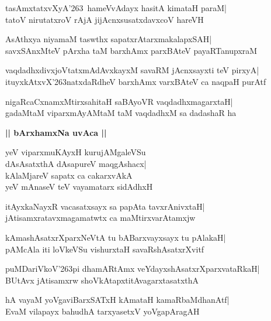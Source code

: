 \documentclass[twoside,12pt,openright]{book}
\def\S{\char'263}
\newcounter{shloka}[chapter]
\def\uvaca#1{\centerline{{\large\textbf{#1}}}}
\begin{document}
\begin{shloka}%
tasAmxtatxvXyA\S \ hameVvAdayx hasitA kimataH paraM|\\
tatoV nirutatxroV rAjA jijAcnxsusatxdavxcoV hareVH
\end{shloka}

\begin{shloka}%
AsAthxya niyamaM taswthx sapatxrAtarxmakalapxSAH|\\
savxSAnxMteV pArxha taM barxhAmx parxBAteV payaRTanupxraM
\end{shloka}

\begin{shloka}%
vaqdadhxdivxjoVtatxmAdAvxkayxM savaRM jAcnxsayxti teV pirxyA|\\
ituyxkAtxvX\S natxdaRdheV barxhAmx varxBAteV ca naqpaH purAtf
\end{shloka}

\begin{shloka}%
nigaRcaCxnamxMtirxsahitaH saBAyoVR vaqdadhxmagarxtaH|\\
gadaMtaM viparxmAyAMtaM taM vaqdadhxM sa dadashaR ha
\end{shloka}

\uvaca{|| bArxhamxNa uvAca ||}
\begin{shloka}%
yeV viparxmuKAyxH kurujAMgaleVSu\\
dAsAsatxthA dAsapureV maqgAshacx|\\
kAlaMjareV sapatx ca cakarxvAkA\\
yeV mAnaseV teV vayamatarx sidAdhxH
\end{shloka}

\begin{shloka}%
itAyxkaNayxR vacasatxsayx sa papAta tavxrAnivxtaH|\\
jAtisamxratavxmagamatwtx ca maMtirxvarAtamxjw
\end{shloka}

\begin{shloka}%
kAmashAsatxrXparxNeVtA tu bABarxvayxsayx tu pAlakaH|\\
pAMcAla iti loVkeVSu vishurxtaH savaRshAsatxrXvitf
\end{shloka}

\begin{shloka}%
puMDariVkoV\S pi dhamARtAmx veYdayxshAsatxrXparxvataRkaH|\\
BUtAvx jAtisamxrw shoVkAtapxtitAvagarxtasatxthA
\end{shloka}

\begin{shloka}%
hA vayaM yoVgaviBarxSATxH kAmataH kamaRbaMdhanAtf|\\
EvaM vilapayx bahudhA tarxyasetxV yoVgapAragAH
\end{shloka}
\end{document}

